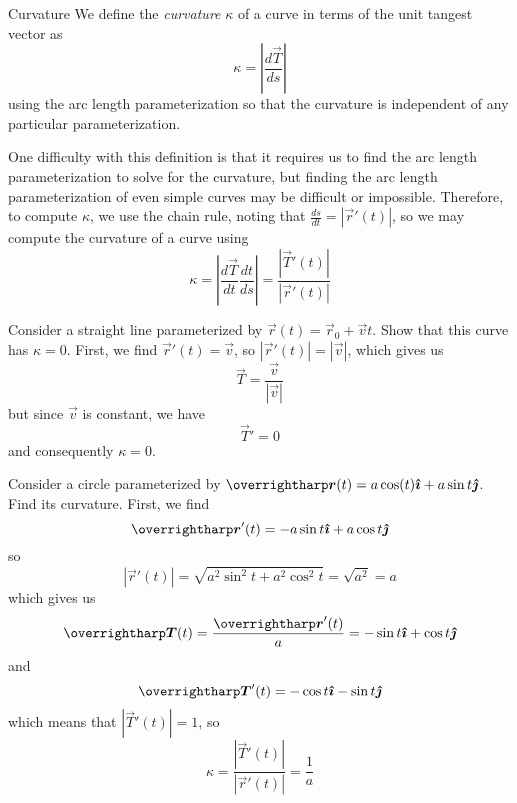\documentclass[../main.tex]{subfiles}
\begin{document}
        \begin{definition}{Curvature}{}
                We define the \emph{curvature} \(\kappa\) of a curve in terms of the unit tangest vector as
                \[
                \kappa = \left| \frac{d\vec{T}}{ds}\right|
                \]
                using the arc length parameterization so that the curvature is independent of any particular parameterization.
        \end{definition}
        One difficulty with this definition is that it requires us to find the arc length parameterization to solve for the curvature, but finding the arc length parameterization of even simple curves may be difficult or impossible. Therefore, to compute \(\kappa\), we use the chain rule, noting that \(\frac{ds}{dt}=|\vec{r}'(t)|\), so we may compute the curvature of a curve using
        \[
        \kappa = \left|\frac{d\vec{T}}{dt}\frac{dt}{ds}\right|=\frac{|\vec{T}'(t)|}{|\vec{r}'(t)|}
        \]
        \begin{example}{}{}
                Consider a straight line parameterized by \(\vec{r}(t)=\vec{r}_0+\vec{v}t\). Show that this curve has \(\kappa=0\).
                \tcblower
                First, we find \(\vec{r}'(t)=\vec{v}\), so \(|\vec{r}'(t)|=|\vec{v}|\), which gives us
                \[
                \vec{T}=\frac{\vec{v}}{|\vec{v}|}
                \]
                but since \(\vec{v}\) is constant, we have
                \[
                \vec{T}'=0
                \]
                and consequently \(\kappa=0\).
        \end{example}
        \begin{example}{}{}
                Consider a circle parameterized by \(\vec{r}(t)=a\cos(t)\i+a\sin{t}\j\). Find its curvature.
                \tcblower
                First, we find
                \[
                \vec{r}'(t)=-a\sin{t}\i+a\cos{t}\j
                \]
                so
                \[
                |\vec{r}'(t)|=\sqrt{a^2\sin^2{t}+a^2\cos^2{t}}=\sqrt{a^2}=a
                \]
                which gives us
                \[
                \vec{T}(t)=\frac{\vec{r}'(t)}{a}=-\sin{t}\i+\cos{t}\j
                \]
                and
                \[
                \vec{T}'(t)=-\cos{t}\i-\sin{t}\j
                \]
                which means that \(|\vec{T}'(t)|=1\), so
                \[
                \kappa = \frac{|\vec{T}'(t)|}{|\vec{r}'(t)|} = \frac{1}{a}
                \]
        \end{example}
\end{document}
